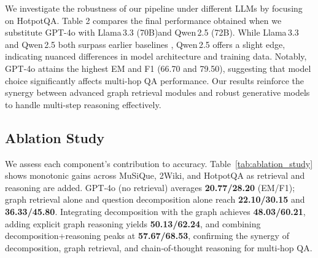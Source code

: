 \documentclass[runningheads]{llncs}
\begin{document}
We investigate the robustness of our pipeline under different LLMs by focusing on HotpotQA. Table 2 compares the final performance obtained when we substitute GPT-4o with Llama\,3.3 (70B)and Qwen\,2.5 (72B). While Llama\,3.3 and Qwen\,2.5 both surpass 
earlier baselines \cite{grattafiori2024llama,yang2025qwen3}
, Qwen\,2.5 offers a slight edge, indicating nuanced differences in model architecture and training data. Notably, GPT-4o attains the highest EM and F1 (66.70 and 79.50), suggesting that model choice significantly affects multi-hop QA performance. Our results reinforce the synergy between advanced graph retrieval modules and robust generative models to handle multi-step reasoning effectively.


\subsection{Ablation Study}
We assess each component’s contribution to accuracy. Table~\ref{tab:ablation_study} shows monotonic gains across MuSiQue, 2Wiki, and HotpotQA as retrieval and reasoning are added. GPT‑4o (no retrieval) averages \textbf{20.77/28.20} (EM/F1); graph retrieval alone and question decomposition alone reach \textbf{22.10/30.15} and \textbf{36.33/45.80}. Integrating decomposition with the graph achieves \textbf{48.03/60.21}, adding explicit graph reasoning yields \textbf{50.13/62.24}, and combining decomposition+reasoning peaks at \textbf{57.67/68.53}, confirming the synergy of decomposition, graph retrieval, and chain‑of‑thought reasoning for multi‑hop QA.
\end{document}
